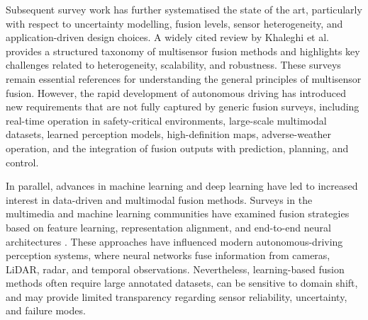 Subsequent survey work has further systematised the state of the art, particularly with respect to uncertainty modelling, fusion levels, sensor heterogeneity, and application-driven design choices. A widely cited review by Khaleghi et al. \cite{khaleghi_multisensor_2013} provides a structured taxonomy of multisensor fusion methods and highlights key challenges related to heterogeneity, scalability, and robustness. These surveys remain essential references for understanding the general principles of multisensor fusion. However, the rapid development of autonomous driving has introduced new requirements that are not fully captured by generic fusion surveys, including real-time operation in safety-critical environments, large-scale multimodal datasets, learned perception models, high-definition maps, adverse-weather operation, and the integration of fusion outputs with prediction, planning, and control.

In parallel, advances in machine learning and deep learning have led to increased interest in data-driven and multimodal fusion methods. Surveys in the multimedia and machine learning communities have examined fusion strategies based on feature learning, representation alignment, and end-to-end neural architectures \cite{atrey_multimodal_2010, baltrusaitis_multimodal_2019}. These approaches have influenced modern autonomous-driving perception systems, where neural networks fuse information from cameras, LiDAR, radar, and temporal observations. Nevertheless, learning-based fusion methods often require large annotated datasets, can be sensitive to domain shift, and may provide limited transparency regarding sensor reliability, uncertainty, and failure modes.

